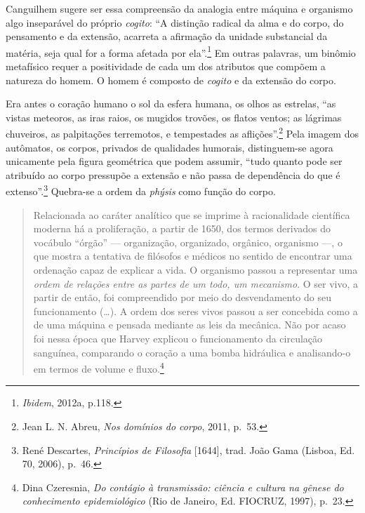 Canguilhem sugere ser essa compreensão da analogia entre máquina e
organismo algo inseparável do próprio \textit{cogito}: ``A distinção
radical da alma e do corpo, do pensamento e da extensão, acarreta a
afirmação da unidade substancial da matéria, seja qual for a forma
afetada por ela''.\footnote{\textit{Ibidem}, 2012a, p.118.} Em outras
palavras, um binômio metafísico requer a positividade de cada um dos
atributos que compõem a natureza do homem. O homem é composto de
\textit{cogito} e da extensão do corpo.

Era antes o coração humano o sol da esfera humana, os olhos as estrelas,
``as vistas meteoros, as iras raios, os mugidos trovões, os flatos
ventos; as lágrimas chuveiros, as palpitações terremotos, e tempestades
as aflições''.\footnote{Jean L. N. Abreu, \textit{Nos domínios do corpo},
  2011, p.~53.} Pela imagem dos autômatos, os corpos, privados de
qualidades humorais, distinguem-se agora unicamente pela figura
geométrica que podem assumir, ``tudo quanto pode ser atribuído ao corpo
pressupõe a extensão e não passa de dependência do que é
extenso''.\footnote{René Descartes, \textit{Princípios de Filosofia}
  {[}1644{]}, trad. João Gama (Lisboa, Ed. 70, 2006), p.~46.} Quebra-se
a ordem da \textit{phýsis} como função do corpo.

\begin{quote}
Relacionada ao caráter analítico que se imprime à racionalidade
científica moderna há a proliferação, a partir de 1650, dos termos
derivados do vocábulo ``órgão'' --- organização, organizado, orgânico,
organismo ---, o que mostra a tentativa de filósofos e médicos no sentido
de encontrar uma ordenação capaz de explicar a vida. O organismo passou
a representar uma \textit{ordem de relações entre as partes de um todo, um
mecanismo}. O ser vivo, a partir de então, foi compreendido por meio do
desvendamento do seu funcionamento (\dots{}). A ordem dos seres vivos passou
a ser concebida como a de uma máquina e pensada mediante as leis da
mecânica. Não por acaso foi nessa época que Harvey explicou o
funcionamento da circulação sanguínea, comparando o coração a uma bomba
hidráulica e analisando-o em termos de volume e fluxo.\footnote{Dina
  Czeresnia, \textit{Do contágio à transmissão: ciência e cultura na
  gênese do conhecimento epidemiológico} (Rio de Janeiro, Ed. FIOCRUZ,
  1997), p.~23.}
\end{quote}

